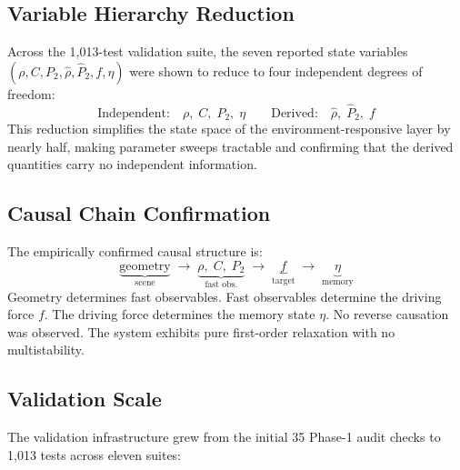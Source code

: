 \documentclass[11pt]{article}
\begin{document}
\subsection{Variable Hierarchy Reduction}

Across the 1,013-test validation suite, the seven reported state
variables $(\rho, C, P_2, \hat{\rho}, \hat{P}_2, f, \eta)$ were
shown to reduce to four independent degrees of freedom:
\[
\text{Independent:}\quad \rho,\; C,\; P_2,\; \eta
\qquad
\text{Derived:}\quad \hat{\rho},\; \hat{P}_2,\; f
\]
This reduction simplifies the state space of the environment-responsive
layer by nearly half, making parameter sweeps tractable and
confirming that the derived quantities carry no independent
information.

\subsection{Causal Chain Confirmation}

The empirically confirmed causal structure is:
\[
\underbrace{\text{geometry}}_{\text{scene}}
\;\longrightarrow\;
\underbrace{\rho,\; C,\; P_2}_{\text{fast obs.}}
\;\longrightarrow\;
\underbrace{f}_{\text{target}}
\;\longrightarrow\;
\underbrace{\eta}_{\text{memory}}
\]
Geometry determines fast observables.  Fast observables determine the
driving force $f$.  The driving force determines the memory state
$\eta$.  No reverse causation was observed.  The system exhibits
pure first-order relaxation with no multistability.

\subsection{Validation Scale}

The validation infrastructure grew from the initial 35 Phase-1
audit checks to 1,013 tests across eleven suites:
\end{document}

